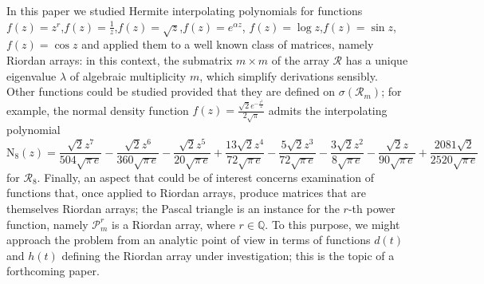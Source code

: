 
In this paper we studied Hermite interpolating polynomials for functions
$f(z)=z^{r}$,${f(z)=\frac{1}{z}}$,${f(z)=\sqrt{z}}$,${f(z)=e^{\alpha z}}$,
${f(z)=\log{z}}$,${f(z)=\sin{z}}$, ${f(z)=\cos{z}}$ and applied them to a well
known class of matrices, namely Riordan arrays: in this context, the submatrix
$m\times m$ of the array $\mathcal{R}$ has a unique eigenvalue $\lambda$ of
algebraic multiplicity $m$, which simplify derivations sensibly.  Other
functions could be studied provided that they are defined on
$\sigma(\mathcal{R}_{m})$; for example, the normal density function $f{\left (z
\right )} = \frac{\sqrt{2} e^{- \frac{z^{2}}{2}}}{2 \sqrt{\pi}}$ admits the
interpolating polynomial 
\begin{displaymath}
\operatorname{N_{ 8 }}{\left (z \right )} =
\frac{\sqrt{2} z^{7}}{504 \sqrt{\pi\,e} } - \frac{\sqrt{2}
z^{6}}{360 \sqrt{\pi\,e} } - \frac{\sqrt{2} z^{5}}{20 \sqrt{\pi\,e}
} + \frac{13 \sqrt{2} z^{4}}{72 \sqrt{\pi\,e} } -
\frac{5 \sqrt{2} z^{3}}{72 \sqrt{\pi\,e} } - \frac{3 \sqrt{2}
z^{2}}{8 \sqrt{\pi\,e} } - \frac{\sqrt{2} z}{90 \sqrt{\pi\,e}
} + \frac{2081 \sqrt{2}}{2520 \sqrt{\pi\,e} }
\end{displaymath}
for $\mathcal{R}_{8}$. Finally, an aspect that could be of interest concerns
    examination of functions that, once applied to Riordan arrays, produce
    matrices that are themselves Riordan arrays; the Pascal triangle is an
    instance for the $r$-th power function, namely $\mathcal{P}_{m}^{r}$ is a
    Riordan array, where $r\in\mathbb{Q}$. To this purpose, we might approach
    the problem from an analytic point of view in terms of functions $d(t)$ and
    $h(t)$ defining the Riordan array under investigation; this is the topic of
    a forthcoming paper.

